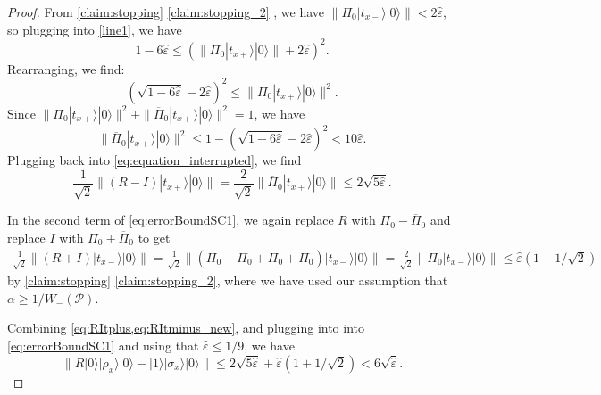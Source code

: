 \documentclass[cleveref, autoref, thm-restate,11pt]{article}
\theoremstyle{definition}
\newcommand{\ket}[1]{|#1\rangle}
\begin{document}
\begin{proof}
From \cref{claim:stopping} \cref{claim:stopping_2} , we have $\|\Pi_0\ket{t_{x-}}\ket{0}\|<2\hat{\varepsilon}$, so plugging into \cref{line1}, we have
\begin{equation}
1-6\hat{\varepsilon}\leq\left(\|\Pi_0\ket{t_{x+}}\ket{0}\|+2\hat{\varepsilon}\right)^2.
\end{equation}
Rearranging, we find:
\begin{equation}
(\sqrt{1-6\hat{\varepsilon}}-2\hat{\varepsilon})^2\leq\|\Pi_0\ket{t_{x+}}\ket{0}\|^2.
\end{equation}
Since $\|\Pi_0\ket{t_{x+}}\ket{0}\|^2+\|\overline{\Pi}_0\ket{t_{x+}}\ket{0}\|^2=1$, we have
\begin{equation}
 \|\overline{\Pi}_0\ket{t_{x+}}\ket{0}\|^2\leq 1-(\sqrt{1-6\hat{\varepsilon}}-2\hat{\varepsilon})^2<10\hat{\varepsilon}.
\end{equation} 
Plugging back into \cref{eq:equation_interrupted}, we find
\begin{equation}
\frac{1}{\sqrt{2}}\|(R-I)\ket{t_{x+}}\ket{0}\|=\frac{2}{\sqrt{2}}\|\overline{\Pi}_0\ket{t_{x+}}\ket{0}\|\leq 2\sqrt{5\hat{\varepsilon}}.
\label{eq:RItplus}
\end{equation}

In the second term of \cref{eq:errorBoundSC1}, we again replace $R$ with 
$\Pi_0-\overline{\Pi}_0$ and replace $I$ with $\Pi_0+\overline{\Pi}_0$ to get
\begin{align}
\frac{1}{\sqrt{2}}\|(R+I)\ket{t_{x-}}\ket{0}\|=
\frac{1}{\sqrt{2}}\|(\Pi_0-\overline{\Pi}_0+\Pi_0+\overline{\Pi}_0)\ket{t_{x-}}\ket{0}\|=\frac{2}{\sqrt{2}}\|\Pi_0\ket{t_{x-}}\ket{0}\|\leq \hat{\varepsilon}(1+1/\sqrt{2})
\label{eq:RItminus_new}
\end{align}
by \cref{claim:stopping} \cref{claim:stopping_2}, where we have used our assumption that
 $\alpha\geq 1/W_-(\mathscr{P})$.

 Combining \cref{eq:RItplus,eq:RItminus_new}, and plugging into into 
\cref{eq:errorBoundSC1} and using that $\hat{\varepsilon}\leq 1/9$, we have
\begin{equation}
\|R\ket{0}\ket{\rho_x}\ket{0}-\ket{1}\ket{\sigma_x}\ket{0}\|
\leq 2\sqrt{5\hat{\varepsilon}}+\hat{\varepsilon}(1+1/\sqrt{2})<6\sqrt{\hat{\varepsilon}}.
\end{equation}









\end{proof}
\end{document}
